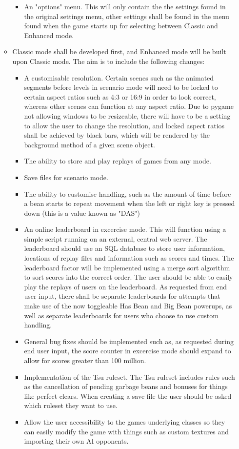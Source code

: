 \documentclass{report}
\begin{document}
\begin{itemize}
\begin{itemize}
\begin{itemize}
            \item An "options" menu. This will only contain the the settings found in the original settings menu, other settings shall be found in the menu found when the game starts up for selecting between Classic and Enhanced mode. 
        \end{itemize}
        \item Classic mode shall be developed first, and Enhanced mode will be built upon Classic mode. The aim is to include the following changes:
        \begin{itemize}
            \item A customisable resolution. Certain scenes such as the animated segments before levels in scenario mode will need to be locked to certain aspect ratios such as 4:3 or 16:9 in order to look correct, whereas other scenes can function at any aspect ratio. Due to pygame not allowing windows to be resizeable, there will have to be a setting to allow the user to change the resolution, and locked aspect ratios shall be achieved by black bars, which will be rendered by the background method of a given scene object.
            \item The ability to store and play replays of games from any mode.
            \item Save files for scenario mode.
            \item The ability to customise handling, such as the amount of time before a bean starts to repeat movement when the left or right key is pressed down (this is a value known as "DAS")
            \item An online leaderboard in excercise mode. This will function using a simple script running on an external, central web server. The leaderboard should use an SQL database to store user information, locations of replay files and information such as scores and times. The leaderboard factor will be implemented using a merge sort algorithm to sort scores into the correct order. The user should be able to easily play the replays of users on the leaderboard. As requested from end user input, there shall be separate leaderboards for attempts that make use of the now toggleable Has Bean and Big Bean powerups, as well as separate leaderboards for users who choose to use custom handling.
            \item General bug fixes should be implemented such as, as requested during end user input, the score counter in excercise mode should expand to allow for scores greater than 100 million.
            \item Implementation of the Tsu ruleset. The Tsu ruleset includes rules such as the cancellation of pending garbage beans and bonuses for things like perfect clears. When creating a save file the user should be asked which ruleset they want to use.
            \item Allow the user accessibility to the games underlying classes so they can easily modify the game with things such as custom textures and importing their own AI opponents.
        \end{itemize}
    \end{itemize}
\end{itemize}
\end{document}
